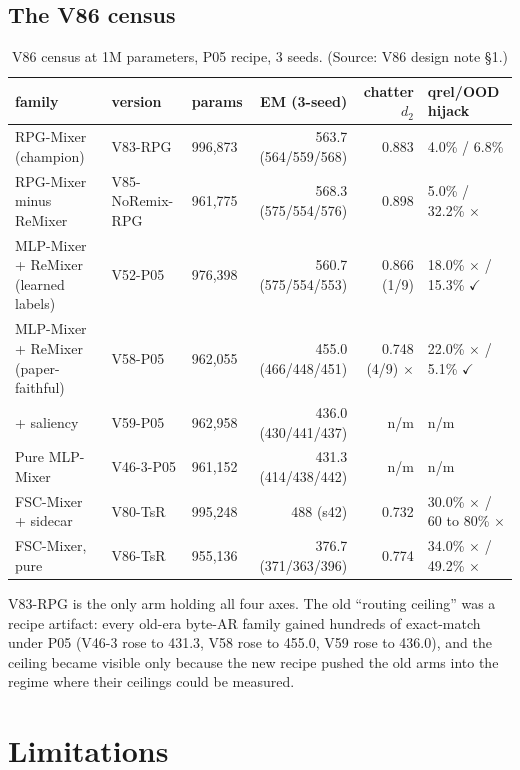 \documentclass[11pt]{article}
\begin{document}
\subsection{The V86 census}

\begin{table}[!t]
\small
\caption{V86 census at 1M parameters, P05 recipe, 3 seeds. (Source: V86 design note \S1.)}
\label{tab:v86-census}
\centering
\setlength{\tabcolsep}{4pt}
\begin{tabular}{p{4.0cm}llrrp{2.4cm}}
\toprule
family & version & params & EM (3-seed) & chatter $d_2$ & qrel/OOD hijack \\
\midrule
RPG-Mixer (champion)             & V83-RPG       & 996,873 & 563.7 (564/559/568) & 0.883 & 4.0\% / 6.8\% \\
RPG-Mixer minus ReMixer          & V85-NoRemix-RPG & 961,775 & 568.3 (575/554/576) & 0.898 & 5.0\% / 32.2\% $\times$ \\
MLP-Mixer + ReMixer (learned labels) & V52-P05     & 976,398 & 560.7 (575/554/553) & 0.866 (1/9) & 18.0\% $\times$ / 15.3\% $\checkmark$ \\
MLP-Mixer + ReMixer (paper-faithful) & V58-P05    & 962,055 & 455.0 (466/448/451) & 0.748 (4/9) $\times$ & 22.0\% $\times$ / 5.1\% $\checkmark$ \\
+ saliency                       & V59-P05        & 962,958 & 436.0 (430/441/437) & n/m & n/m \\
Pure MLP-Mixer                   & V46-3-P05      & 961,152 & 431.3 (414/438/442) & n/m & n/m \\
FSC-Mixer + sidecar              & V80-TsR        & 995,248 & 488 (s42) & 0.732 & 30.0\% $\times$ / 60 to 80\% $\times$ \\
FSC-Mixer, pure                  & V86-TsR        & 955,136 & 376.7 (371/363/396) & 0.774 & 34.0\% $\times$ / 49.2\% $\times$ \\
\bottomrule
\end{tabular}
\end{table}

V83-RPG is the only arm holding all four axes. The old ``routing ceiling'' was a recipe artifact: every old-era byte-AR family gained hundreds of exact-match under P05 (V46-3 rose to 431.3, V58 rose to 455.0, V59 rose to 436.0), and the ceiling became visible only because the new recipe pushed the old arms into the regime where their ceilings could be measured.

\section{Limitations}
\end{document}
